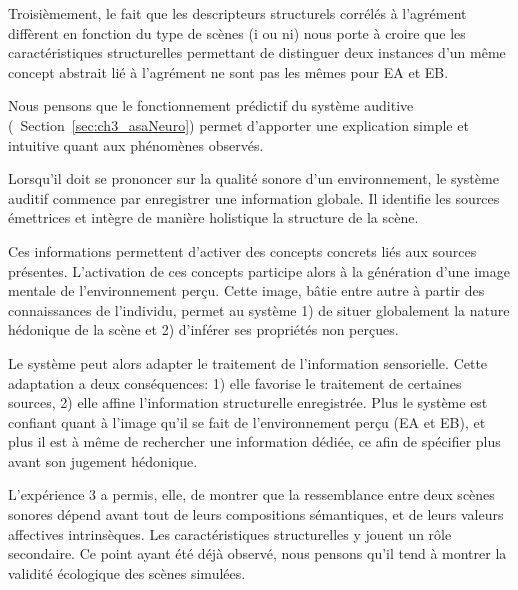 Troisièmement, le fait que les descripteurs structurels corrélés à l'agrément diffèrent en fonction du type de scènes (i ou ni) nous porte à croire que les caractéristiques structurelles permettant de distinguer deux instances d'un même concept abstrait lié à l'agrément ne sont pas les mêmes pour EA et EB.

Nous pensons que le fonctionnement prédictif du système auditive (\cf~Section~\ref{sec:ch3_asaNeuro}) permet d'apporter une explication simple et intuitive quant aux phénomènes observés. 

Lorsqu'il doit se prononcer sur la qualité sonore d'un environnement, le système auditif commence par enregistrer une information globale. Il identifie les sources émettrices et intègre de manière holistique la structure de la scène. 

Ces informations permettent d'activer des concepts concrets liés aux sources présentes. L'activation de ces concepts participe alors à la génération d'une image mentale de l'environnement perçu. Cette image, bâtie entre autre à partir des connaissances de l'individu, permet au système 1) de situer globalement la nature hédonique de la scène et 2) d'inférer ses propriétés non perçues. 

Le système peut alors adapter le traitement de l'information sensorielle. Cette adaptation a deux conséquences: 1) elle favorise le traitement de certaines sources, 2) elle affine l'information structurelle enregistrée. Plus le système est confiant quant à l'image qu'il se fait de l'environnement perçu (EA et EB), et plus il est à même de rechercher une information dédiée, ce afin de spécifier plus avant son jugement hédonique.

L'expérience 3 a permis, elle, de montrer que la ressemblance entre deux scènes sonores dépend avant tout de leurs compositions sémantiques, et de leurs valeurs affectives intrinsèques. Les caractéristiques structurelles y jouent un rôle secondaire. Ce point ayant été déjà observé, nous pensons qu'il tend à montrer la validité écologique des scènes simulées.


